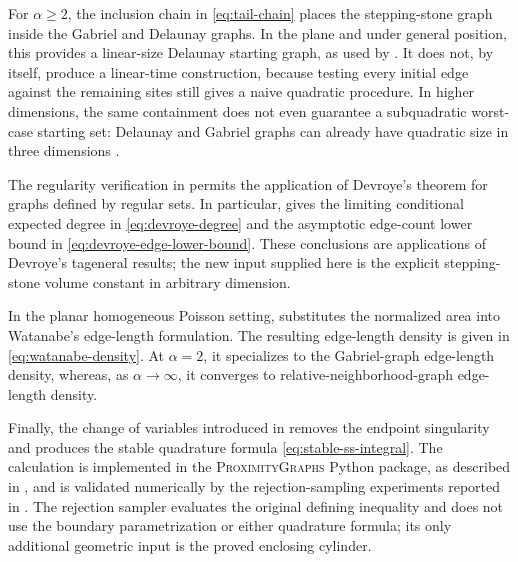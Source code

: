 \documentclass[a4paper,fleqn]{cas-dc}
\theoremstyle{definition}
\theoremstyle{remark}
\newcommand{\0}{\mathbf{0}}
\begin{document}
For $\alpha\geq2$, the inclusion chain in \eqref{eq:tail-chain} places the
stepping-stone graph inside the Gabriel and Delaunay graphs. In the plane
and under general position, this provides a linear-size Delaunay starting
graph, as used by
\citet{kannangara2018stepping,kannangara2019stepping}. It does not, by
itself, produce a linear-time construction, because testing every initial
edge against the remaining sites still gives a naive quadratic procedure.
In higher dimensions, the same containment does not even guarantee a
subquadratic worst-case starting set: Delaunay and Gabriel graphs can
already have quadratic size in three dimensions
\citep{agarwal1992relative,chazelle1994selecting}.

The regularity verification in  permits the
application of Devroye's theorem 
for graphs defined by regular sets.
In particular,
 gives the limiting conditional expected degree
in \eqref{eq:devroye-degree} and the asymptotic edge-count lower bound in
\eqref{eq:devroye-edge-lower-bound}. These conclusions are applications of
Devroye's  ta{general results}; the new input supplied here is the explicit
stepping-stone volume constant in arbitrary dimension.

In the planar homogeneous Poisson setting,
 substitutes the normalized area into
Watanabe's edge-length formulation. The resulting edge-length density
is given in \eqref{eq:watanabe-density}. At $\alpha=2$, it specializes
to the Gabriel-graph edge-length density, whereas, as
$\alpha\to\infty$, it converges to 
relative-neighborhood-graph edge-length density.

Finally, the change of variables introduced in
 removes the endpoint singularity and produces
the stable quadrature formula \eqref{eq:stable-ss-integral}. The calculation
is implemented in the \textsc{ProximityGraphs} Python package, as described
in , and is validated numerically by the
rejection-sampling experiments reported in . The
rejection sampler evaluates the original defining inequality and does not
use the boundary parametrization or either quadrature formula; its only
additional geometric input is the proved enclosing cylinder.
\end{document}
